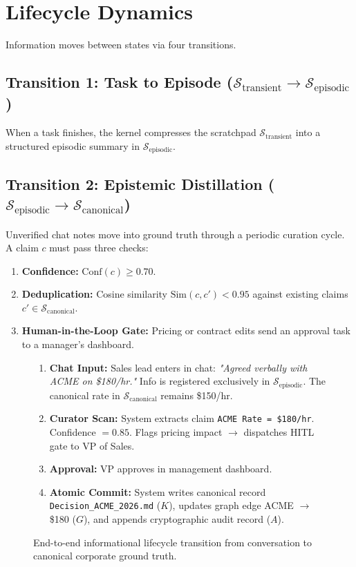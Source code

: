 \documentclass[10pt,journal,compsoc]{IEEEtran}
\begin{document}
\section{Lifecycle Dynamics}
\label{sec:lifecycle}

Information moves between states via four transitions.

\subsection{Transition 1: Task to Episode ($\mathcal{S}_{\text{transient}} \rightarrow \mathcal{S}_{\text{episodic}}$)}
When a task finishes, the kernel compresses the scratchpad $\mathcal{S}_{\text{transient}}$ into a structured episodic summary in $\mathcal{S}_{\text{episodic}}$.

\subsection{Transition 2: Epistemic Distillation ($\mathcal{S}_{\text{episodic}} \rightarrow \mathcal{S}_{\text{canonical}}$)}
Unverified chat notes move into ground truth through a periodic curation cycle. A claim $c$ must pass three checks:
\begin{enumerate}
    \item \textbf{Confidence:} $\text{Conf}(c) \ge 0.70$.
    \item \textbf{Deduplication:} Cosine similarity $\text{Sim}(c, c') < 0.95$ against existing claims $c' \in \mathcal{S}_{\text{canonical}}$.
    \item \textbf{Human-in-the-Loop Gate:} Pricing or contract edits send an approval task to a manager's dashboard.
\end{enumerate}

\begin{figure}[h]
\centering
\begin{tcolorbox}[colback=blue!5!white,colframe=blue!75!black,title=\textbf{Case Study: ACME Rate Revision Lifecycle}]
\begin{enumerate}
    \item \textbf{Chat Input:} Sales lead enters in chat: \emph{"Agreed verbally with ACME on \$180/hr."} Info is registered exclusively in $\mathcal{S}_{\text{episodic}}$. The canonical rate in $\mathcal{S}_{\text{canonical}}$ remains \$150/hr.
    \item \textbf{Curator Scan:} System extracts claim \texttt{ACME Rate = \$180/hr}. Confidence $= 0.85$. Flags pricing impact $\rightarrow$ dispatches HITL gate to VP of Sales.
    \item \textbf{Approval:} VP approves in management dashboard.
    \item \textbf{Atomic Commit:} System writes canonical record \texttt{Decision\_ACME\_2026.md} ($K$), updates graph edge ACME $\rightarrow$ \$180 ($G$), and appends cryptographic audit record ($A$).
\end{enumerate}
\end{tcolorbox}
\caption{End-to-end informational lifecycle transition from conversation to canonical corporate ground truth.}
\label{fig:casestudy}
\end{figure}
\end{document}
